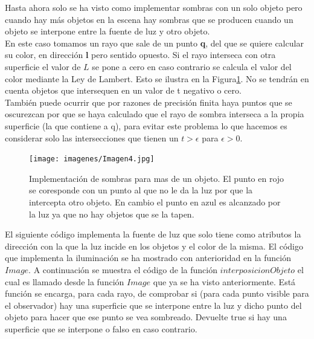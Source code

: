 Hasta ahora solo se ha visto como implementar sombras con un solo objeto pero cuando hay más objetos en la escena hay sombras que se producen cuando un objeto se interpone entre la fuente de luz y otro objeto.
	${ }$\\	
	
En este caso tomamos un rayo que sale de un punto \textbf{q}, del que se quiere calcular su color, en dirección \textbf{l} pero sentido opuesto. Si el rayo interseca con otra superficie el valor de $L$ se pone a cero en caso contrario se calcula el valor del color mediante la Ley de Lambert. Esto se ilustra en la Figura\ref{fig:etiq_6}. No se tendrán en cuenta objetos que intersequen en un valor de t negativo o cero.
	${ }$\\	
	
También puede ocurrir que por razones de precisión finita haya puntos que se oscurezcan por que se haya calculado que el rayo de sombra interseca a la propia superficie (la que contiene a q), para evitar este problema lo que hacemos es considerar solo las intersecciones que tienen un $t > \epsilon$ para $\epsilon > 0 $.
	${ }$\\	

\begin{figure}[h]
	\begin{center}
		\texttt{[image: imagenes/Imagen4.jpg]}
	\end{center}
	\caption{Implementación de sombras para mas de un objeto. El punto en rojo se coresponde con un punto al que no le da la luz por que la intercepta otro objeto. En cambio el punto en azul es alcanzado por la luz ya que no hay objetos que se la tapen.}
	\label{fig:etiq_6}
\end{figure}

El siguiente código implementa la fuente de luz que solo tiene como atributos la dirección con la que la luz incide en los objetos y el color de la misma. El código que implementa la iluminación se ha mostrado con anterioridad en la función $Image$. A continuación se muestra el código de la función $interposicionObjeto$ el cual es llamado desde la función $Image$ que ya se ha visto anteriormente. Está función se encarga, para cada rayo, de comprobar si (para cada punto visible para el observador) hay una superficie que se interpone entre la luz y dicho punto del objeto para hacer que ese punto se vea sombreado. Devuelte true si hay una superficie que se interpone o falso en caso contrario.
	${ }$\\



